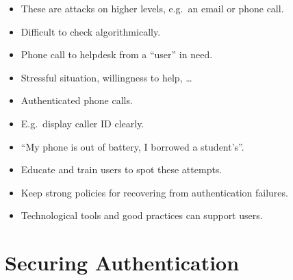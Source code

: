 \begin{frame}
  \begin{remark}
    \begin{itemize}
      \item These are attacks on higher levels, e.g.\ an email or phone call.
      \item Difficult to check algorithmically.
    \end{itemize}
  \end{remark}

  \begin{example}
    \begin{itemize}
      \item Phone call to helpdesk from a \enquote{user} in need.
      \item Stressful situation, willingness to help, \dots
    \end{itemize}
  \end{example}

  \pause{}
  
  \begin{example}[Solution?]
    \begin{itemize}
      \item Authenticated phone calls.
      \item E.g.\ display caller ID clearly.
      \item \enquote{My phone is out of battery, I borrowed a student's}.
    \end{itemize}
  \end{example}
\end{frame}

\begin{frame}
  \begin{solution}
    \begin{itemize}
      \item Educate and train users to spot these attempts.

      \item Keep strong policies for recovering from authentication failures. 

      \item Technological tools and good practices can support users.
    \end{itemize}
  \end{solution}
\end{frame}


\section[Securing]{Securing Authentication}

